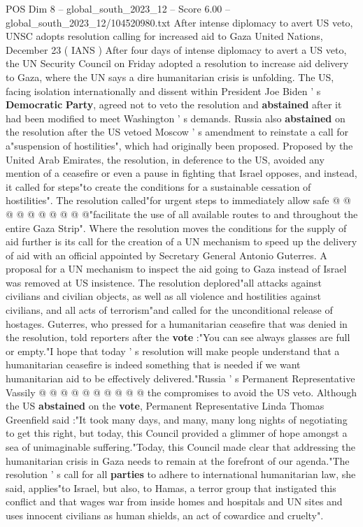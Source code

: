 \begin{textsample}{POS Dim 8 – global\_south\_2023\_12 – Score 6.00 – global\_south\_2023\_12/104520980.txt}  \label{ex:f8_pos_232}
After intense diplomacy to avert US veto, UNSC adopts resolution calling for increased aid to Gaza United Nations, December 23 ( IANS ) After four days of intense diplomacy to avert a US veto, the UN Security Council on Friday adopted a resolution to increase aid delivery to Gaza, where the UN says a dire humanitarian crisis is unfolding.
The US, facing isolation internationally and dissent within President Joe Biden ' s \textbf{Democratic} \textbf{Party}, agreed not to veto the resolution and \textbf{abstained} after it had been modified to meet Washington ' s demands.
Russia also \textbf{abstained} on the resolution after the US vetoed Moscow ' s amendment to reinstate a call for a"suspension of hostilities", which had originally been proposed.
Proposed by the United Arab Emirates, the resolution, in deference to the US, avoided any mention of a ceasefire or even a pause in fighting that Israel opposes, and instead, it called for steps"to create the conditions for a sustainable cessation of hostilities".
The resolution called"for urgent steps to immediately allow safe @ @ @ @ @ @ @ @ @ @"facilitate the use of all available routes to and throughout the entire Gaza Strip".
Where the resolution moves the conditions for the supply of aid further is its call for the creation of a UN mechanism to speed up the delivery of aid with an official appointed by Secretary General Antonio Guterres.
A proposal for a UN mechanism to inspect the aid going to Gaza instead of Israel was removed at US insistence.
The resolution deplored"all attacks against civilians and civilian objects, as well as all violence and hostilities against civilians, and all acts of terrorism"and called for the unconditional release of hostages.
Guterres, who pressed for a humanitarian ceasefire that was denied in the resolution, told reporters after the \textbf{vote} :"You can see always glasses are full or empty."I hope that today ' s resolution will make people understand that a humanitarian ceasefire is indeed something that is needed if we want humanitarian aid to be effectively delivered."Russia ' s Permanent Representative Vassily @ @ @ @ @ @ @ @ @ @ the compromises to avoid the US veto.
Although the US \textbf{abstained} on the \textbf{vote}, Permanent Representative Linda Thomas Greenfield said :"It took many days, and many, many long nights of negotiating to get this right, but today, this Council provided a glimmer of hope amongst a sea of unimaginable suffering."Today, this Council made clear that addressing the humanitarian crisis in Gaza needs to remain at the forefront of our agenda."The resolution ' s call for all \textbf{parties} to adhere to international humanitarian law, she said, applies"to Israel, but also, to Hamas, a terror group that instigated this conflict and that wages war from inside homes and hospitals and UN sites and uses innocent civilians as human shields, an act of cowardice and cruelty".

\end{textsample}
